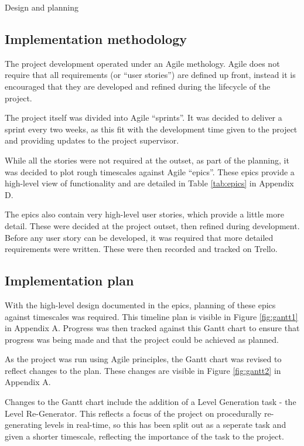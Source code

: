 \documentclass[final]{cmpreport}
\begin{document}
\begin{section}{Design and planning}

\subsection{Implementation methodology}
The project development operated under an Agile methology. Agile does not require that all requirements (or ``user stories'') are defined up front, instead it is encouraged that they are developed and refined during the lifecycle of the project.

The project itself was divided into Agile ``sprints''. It was decided to deliver a sprint every two weeks, as this fit with the development time given to the project and providing updates to the project supervisor.

While all the stories were not required at the outset, as part of the planning, it was decided to plot rough timescales against Agile ``epics''. These epics provide a high-level view of functionality and are detailed in Table \ref{tab:epics} in Appendix D.

The epics also contain very high-level user stories, which provide a little more detail. These were decided at the project outset, then refined during development. Before any user story can be developed, it was required that more detailed requirements were written. These were then recorded and tracked on Trello. 

\subsection{Implementation plan}

With the high-level design documented in the epics, planning of these epics against timescales was required. This timeline plan is visible in Figure \ref{fig:gantt1} in Appendix A. Progress was then tracked against this Gantt chart to ensure that progress was being made and that the project could be achieved as planned.

As the project was run using Agile principles, the Gantt chart was revised to reflect changes to the plan. These changes are visible in Figure \ref{fig:gantt2} in Appendix A. 

Changes to the Gantt chart include the addition of a Level Generation task - the Level Re-Generator. This reflects a focus of the project on procedurally re-generating levels in real-time, so this has been split out as a seperate task and given a shorter timescale, reflecting the importance of the task to the project.


\end{section}
\end{document}
